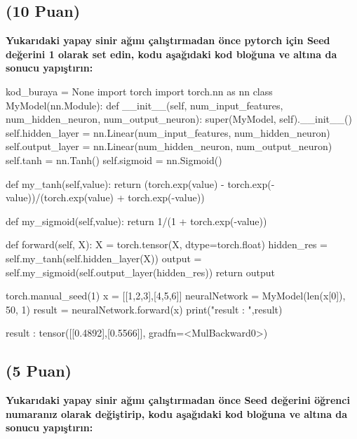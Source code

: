 \documentclass[11pt]{article}
\begin{document}
\subsection{(10 Puan)} \textbf{Yukarıdaki yapay sinir ağını çalıştırmadan önce pytorch için Seed değerini 1 olarak set edin, kodu aşağıdaki kod bloğuna ve altına da sonucu yapıştırın:}

\begin{python}
kod_buraya = None
import torch
import torch.nn as nn
class MyModel(nn.Module):
    def __init__(self, num_input_features, num_hidden_neuron, num_output_neuron):
        super(MyModel, self).__init__()
        self.hidden_layer = nn.Linear(num_input_features, num_hidden_neuron)
        self.output_layer = nn.Linear(num_hidden_neuron, num_output_neuron)
        self.tanh = nn.Tanh()
        self.sigmoid = nn.Sigmoid()
        
    def my_tanh(self,value):
        return (torch.exp(value) - torch.exp(-value))/(torch.exp(value) + torch.exp(-value))
    
    def my_sigmoid(self,value):
        return 1/(1 + torch.exp(-value))

    def forward(self, X):
        X = torch.tensor(X, dtype=torch.float)
        hidden_res = self.my_tanh(self.hidden_layer(X))
        output = self.my_sigmoid(self.output_layer(hidden_res))
        return output

torch.manual_seed(1)
x = [[1,2,3],[4,5,6]]
neuralNetwork = MyModel(len(x[0]), 50, 1)
result = neuralNetwork.forward(x)
print("result : ",result)
\end{python}

result :  tensor([[0.4892],[0.5566]], gradfn=<MulBackward0>)

\subsection{(5 Puan)} \textbf{Yukarıdaki yapay sinir ağını çalıştırmadan önce Seed değerini öğrenci numaranız olarak değiştirip, kodu aşağıdaki kod bloğuna ve altına da sonucu yapıştırın:}
\end{document}
